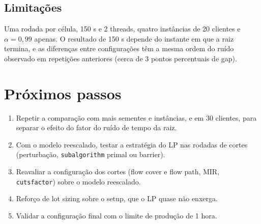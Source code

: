 \documentclass[11pt,a4paper]{article}
\begin{document}
\subsection{Limitações}

Uma rodada por célula, 150 s e 2 threads, quatro instâncias de 20 clientes e
$\alpha=0{,}99$ apenas. O resultado de 150 s depende do instante em que a
raiz termina, e as diferenças entre configurações têm a mesma ordem do ruído
observado em repetições anteriores (cerca de 3 pontos percentuais de gap).

\section{Próximos passos}

\begin{enumerate}[leftmargin=*]
  \item Repetir a comparação com mais sementes e instâncias, e em 30 clientes,
  para separar o efeito do fator do ruído de tempo da raiz.
  \item Com o modelo reescalado, testar a estratégia do LP nas rodadas de
  cortes (perturbação, \texttt{subalgorithm} primal ou barrier).
  \item Reavaliar a configuração dos cortes (flow cover e flow path, MIR,
  \texttt{cutsfactor}) sobre o modelo reescalado.
  \item Reforço de lot sizing sobre o setup, que o LP quase não enxerga.
  \item Validar a configuração final com o limite de produção de 1 hora.
\end{enumerate}
\end{document}
